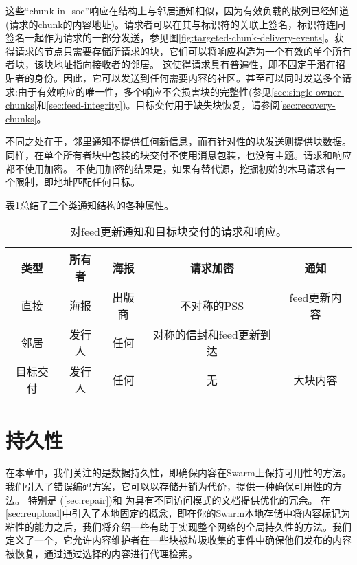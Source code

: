 这些“chunk-in- soc”响应在结构上与邻居通知相似，因为有效负载的散列已经知道(请求的chunk的内容地址)。请求者可以在其与标识符的关联上签名，标识符连同签名一起作为请求的一部分发送，参见图\ref{fig:targeted-chunk-delivery-events}。获得请求的节点只需要存储所请求的块，它们可以将响应构造为一个有效的单个所有者块，该块地址指向接收者的邻居。
这使得请求具有普遍性，即不固定于潜在招贴者的身份。因此，它可以发送到任何需要内容的社区。甚至可以同时发送多个请求:由于有效响应的唯一性，多个响应不会损害块的完整性(参见\ref{sec:single-owner-chunks}和\ref{sec:feed-integrity})。目标交付用于缺失块恢复，请参阅\ref{sec:recovery-chunks}。

不同之处在于，邻里通知不提供任何新信息，而有针对性的块发送则提供块数据。同样，在单个所有者块中包装的块交付不使用消息包装，也没有主题。请求和响应都不使用加密。
不使用加密的结果是，如果有替代源，挖掘初始的木马请求有一个限制，即地址匹配任何目标。

表\ref{tab:notifications}总结了三个类通知结构的各种属性。

\begin{table}[htpb]
    \centering
    \begin{tabular}{c c c c c | | | | |}
    类型&所有者&海报&请求加密&通知\\\hline
直接&海报&出版商&不对称的PSS & feed更新内容\\
邻居&发行人&任何&对称的信封和feed更新到达\\
目标交付&发行人&任何&无&大块内容\\
    \end{tabular}
    \caption[提要更新通知]{对feed更新通知和目标块交付的请求和响应。}
    \label{tab:notifications}
\end{table}

\chapter{持久性\statusgreen}\label{sec:persistence}


在本章中，我们关注的是数据持久性，即确保内容在Swarm上保持可用性的方法。
我们引入了错误编码方案，它可以以存储开销为代价，提供一种确保可用性的方法。
特别是 (\ref{sec:repair})和 %
为具有不同访问模式的文档提供优化的冗余。
在\ref{sec:reupload}中引入了本地固定的概念，即在你的Swarm本地存储中将内容标记为粘性的能力之后，我们将介绍一些有助于实现整个网络的全局持久性的方法。我们定义了一个，它允许内容维护者在一些块被垃圾收集的事件中确保他们发布的内容被恢复，通过通过选择的内容进行代理检索。

